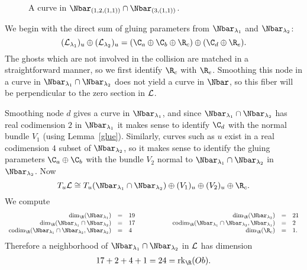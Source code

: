 \begin{example}
\begin{figure}[ht]
\caption{A curve in $\Nbar_{(1,2,(1,1))} \cap \Nbar_{(3,(1,1))}$.}
\label{pic31coll}
\end{figure}

We begin with the direct sum of gluing parameters from $\Nbar_{\lambda_1}$ and $\Nbar_{\lambda_2}$:
\[
(\L_{\lambda_1})_u \oplus (\L_{\lambda_2})_u = (\C_a \oplus \C_b \oplus \R_c) \oplus (\C_d \oplus \R_e).
\]
The ghosts which are not involved in the collision are matched in a straightforward manner, so we first identify $\R_c$ with $\R_e$. Smoothing this node in a curve in $\Nbar_{\lambda_1} \cap \Nbar_{\lambda_2}$ does not yield a curve in $\Nbar$, so this fiber will be perpendicular to the zero section in $\mathcal{L}$.

Smoothing node $d$ gives a curve in $\Nbar_{\lambda_1}$, and since $\Nbar_{\lambda_1} \cap \Nbar_{\lambda_2}$ has real codimension $2$ in $\Nbar_{\lambda_1}$ it makes sense to identify $\C_d$ with the normal bundle $V_1$ (using Lemma~\ref{glue}). Similarly, curves such as $u$ exist in a real codimension $4$ subset of $\Nbar_{\lambda_2}$, so it makes sense to identify the gluing parameters $\C_a \oplus \C_b$ with the bundle $V_2$ normal to $\Nbar_{\lambda_1} \cap \Nbar_{\lambda_2}$ in $\Nbar_{\lambda_2}$. Now
\[
T_u\L \cong T_u(\Nbar_{\lambda_1} \cap \Nbar_{\lambda_2}) \oplus (V_1)_u \oplus (V_2)_u \oplus \R_c.
\]
We compute
\[
\begin{array}{rclcrcl}
\dim_\R(\Nbar_{\lambda_1}) & = & 19 & \qquad\qquad & \dim_\R(\Nbar_{\lambda_2}) & = & 21
\\
\dim_\R(\Nbar_{\lambda_1} \cap \Nbar_{\lambda_2}) & = & 17 && \codim_\R(\Nbar_{\lambda_1} \cap \Nbar_{\lambda_2},\Nbar_{\lambda_1}) & = & 2
\\
\codim_\R(\Nbar_{\lambda_1} \cap \Nbar_{\lambda_2},\Nbar_{\lambda_2}) & = & 4 && \dim_\R(\R_c) & = & 1.
\end{array}
\]
Therefore a neighborhood of $\Nbar_{\lambda_1} \cap \Nbar_{\lambda_2}$ in $\mathcal{L}$ has dimension
\begin{align*}
17+2+4+1 = 24 = \rk_\R(Ob).
\end{align*}
\end{example}

